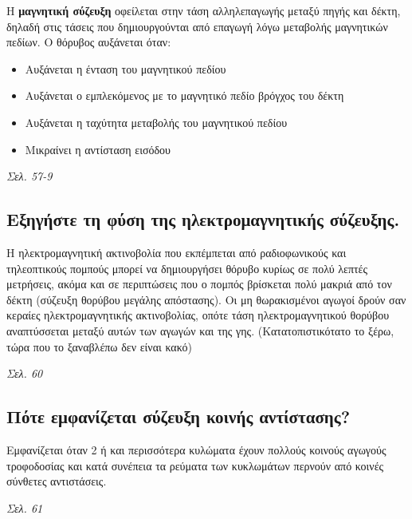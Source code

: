 \documentclass{article}
\begin{document}
Η \textbf{μαγνητική σύζευξη} οφείλεται στην τάση αλληλεπαγωγής μεταξύ πηγής και δέκτη, δηλαδή στις τάσεις που δημιουργούνται από επαγωγή λόγω μεταβολής μαγνητικών πεδίων. Ο θόρυβος αυξάνεται όταν:
\begin{itemize}
    \item Aυξάνεται η ένταση του μαγνητικού πεδίου
    \item Αυξάνεται ο εμπλεκόμενος με το μαγνητικό πεδίο βρόγχος του δέκτη
    \item Αυξάνεται η ταχύτητα μεταβολής του μαγνητικού πεδίου
    \item Μικραίνει η αντίσταση εισόδου
\end{itemize}

\emph{Σελ. 57-9}

\subsection{Εξηγήστε τη φύση της ηλεκτρομαγνητικής σύζευξης.}
Η ηλεκτρομαγνητική ακτινοβολία που εκπέμπεται από ραδιοφωνικούς και τηλεοπτικούς πομπούς μπορεί να δημιουργήσει θόρυβο κυρίως σε πολύ λεπτές μετρήσεις, ακόμα και σε 
περιπτώσεις που ο πομπός βρίσκεται πολύ μακριά από τον δέκτη (σύζευξη θορύβου μεγάλης απόστασης). Οι μη θωρακισμένοι αγωγοί δρούν σαν κεραίες ηλεκτρομαγνητικής 
ακτινοβολίας, οπότε τάση ηλεκτρομαγνητικού θορύβου αναπτύσσεται μεταξύ αυτών των αγωγών και της γης. (Κατατοπιστικότατο το ξέρω, τώρα που το ξαναβλέπω δεν είναι κακό)

\emph{Σελ. 60}

\subsection{Πότε εμφανίζεται σύζευξη κοινής αντίστασης?}
Εμφανίζεται όταν 2 ή και περισσότερα κυλώματα έχουν πολλούς κοινούς αγωγούς τροφοδοσίας και κατά συνέπεια τα ρεύματα των κυκλωμάτων περνούν από κοινές σύνθετες αντιστάσεις.

\emph{Σελ. 61}
\end{document}

